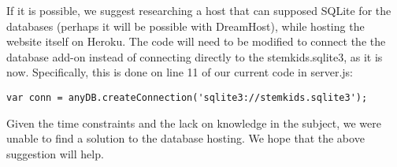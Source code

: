 \documentclass[12pt]{article}
\begin{document}
If it is possible, we suggest researching a host that can supposed SQLite for the databases (perhaps it will be possible with DreamHost), while hosting the website itself on Heroku. The code will need to be modified to connect the the database add-on instead of connecting directly to the stemkids.sqlite3, as it is now. Specifically, this is done on line 11 of our current code in server.js:
\begin{lstlisting}
var conn = anyDB.createConnection('sqlite3://stemkids.sqlite3');
\end{lstlisting}
Given the time constraints and the lack on knowledge in the subject, we were unable to find a solution to the database hosting. We hope that the above suggestion will help.
\end{document}
